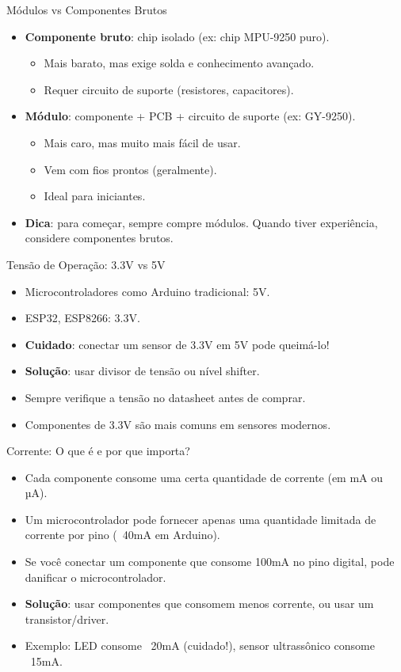 \documentclass[10pt]{beamer}
\begin{document}
\begin{frame}{Módulos vs Componentes Brutos}
  \begin{itemize}
    \item \textbf{Componente bruto}: chip isolado (ex: chip MPU-9250 puro).
    \begin{itemize}
      \item Mais barato, mas exige solda e conhecimento avançado.
      \item Requer circuito de suporte (resistores, capacitores).
    \end{itemize}
    \item \textbf{Módulo}: componente + PCB + circuito de suporte (ex: GY-9250).
    \begin{itemize}
      \item Mais caro, mas muito mais fácil de usar.
      \item Vem com fios prontos (geralmente).
      \item Ideal para iniciantes.
    \end{itemize}
    \item \textbf{Dica}: para começar, sempre compre módulos. Quando tiver experiência, considere componentes brutos.
  \end{itemize}
\end{frame}

\begin{frame}{Tensão de Operação: 3.3V vs 5V}
  \begin{itemize}
    \item Microcontroladores como Arduino tradicional: 5V.
    \item ESP32, ESP8266: 3.3V.
    \item \textbf{Cuidado}: conectar um sensor de 3.3V em 5V pode queimá-lo!
    \item \textbf{Solução}: usar divisor de tensão ou nível shifter.
    \item Sempre verifique a tensão no datasheet antes de comprar.
    \item Componentes de 3.3V são mais comuns em sensores modernos.
  \end{itemize}
\end{frame}

\begin{frame}{Corrente: O que é e por que importa?}
  \begin{itemize}
    \item Cada componente consome uma certa quantidade de corrente (em mA ou µA).
    \item Um microcontrolador pode fornecer apenas uma quantidade limitada de corrente por pino (~40mA em Arduino).
    \item Se você conectar um componente que consome 100mA no pino digital, pode danificar o microcontrolador.
    \item \textbf{Solução}: usar componentes que consomem menos corrente, ou usar um transistor/driver.
    \item Exemplo: LED consome ~20mA (cuidado!), sensor ultrassônico consome ~15mA.
  \end{itemize}
\end{frame}
\end{document}
